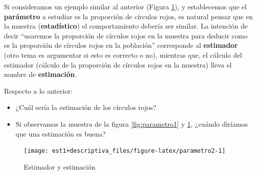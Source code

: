 \documentclass[
  11pt,
]{book}
\providecommand{\tightlist}{%
  \setlength{\itemsep}{0pt}\setlength{\parskip}{0pt}}
\theoremstyle{definition}
\theoremstyle{definition}
\theoremstyle{definition}
\theoremstyle{definition}
\theoremstyle{remark}
\begin{document}
Si consideramos un ejemplo similar al anterior (Figura \ref{fig:parametro2}), y establecemos que el \textbf{parámetro} a estudiar es la proporción de círculos rojos, es natural pensar que en la muestra (\textbf{estadístico}) el comportamiento debería ser similar. La intención de decir ``usaremos la proporción de círculos rojos en la muestra para deducir como es la proporción de círculos rojos en la población'' corresponde al \textbf{estimador} (otro tema es argumentar si esto es correcto o no), mientras que, el cálculo del estimador (cálculo de la proporción de círculos rojos en la muestra) lleva el nombre de \textbf{estimación}.

Respecto a lo anterior:

\begin{itemize}
\tightlist
\item
  ¿Cuál sería la estimación de los círculos rojos?
\item
  Si observamos la muestra de la figura \ref{fig:parametro1} y \ref{fig:parametro2}, ¿cuándo diríamos que una estimación es buena?
\end{itemize}

\begin{figure}

{\centering \texttt{[image: est1+descriptiva\_files/figure-latex/parametro2-1]} 

}

\caption{Estimador y estimación}\label{fig:parametro2}
\end{figure}
\end{document}
